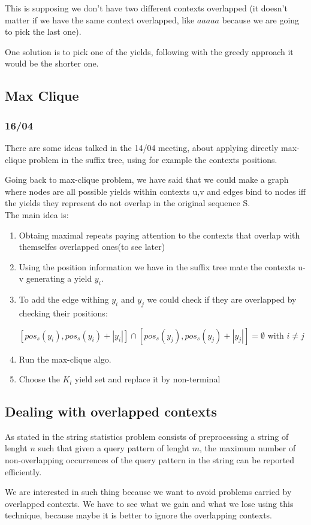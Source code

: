 This is supposing we don't have two different contexts overlapped (it doesn't matter if we have the same context overlapped, like $aaaaa$ because we are going to pick the last one).

One solution is to pick one of the yields, following with the greedy approach it would be the shorter one. 

\subsection{Max Clique} 
\subsubsection{16/04}

There are some ideas talked in the 14/04 meeting, about applying directly max-clique problem in the suffix tree, using for example the contexts positions.

Going back to max-clique problem, we have said that we could make a graph where nodes are all possible yields within contexts u,v and edges bind to nodes iff the yields they represent do not overlap in the original sequence S.\\

The main idea is:
\begin{enumerate}
	\item Obtaing maximal repeats paying attention to the contexts that overlap with themselfes overlapped ones(to see later)
	\item Using the position information we have in the suffix tree mate the contexts u-v generating a yield $y_i$.
	\item To add the edge withing $y_i$ and $y_j$ we could check if they are overlapped by checking their positions: 

		\begin{center}
			$[pos_s(y_i), pos_s(y_i)+|y_i|] \cap [pos_s(y_j), pos_s(y_j)+|y_j|] = \emptyset$ with $i \neq j$
		\end{center}
	\item Run the max-clique algo.
	\item Choose the $K_l$ yield set and replace it by non-terminal
\end{enumerate}


\subsection{Dealing with overlapped contexts}

As stated in \cite{StringStats} the string statistics problem consists of preprocessing a string of lenght $n$ such that given a query pattern of lenght $m$, the maximum number of non-overlapping occurrences of the query pattern in the string can be reported efficiently. 

We are interested in such thing because we want to avoid problems carried by overlapped contexts. We have to see what we gain and what we lose using this technique, because maybe it is better to ignore the overlapping contexts.